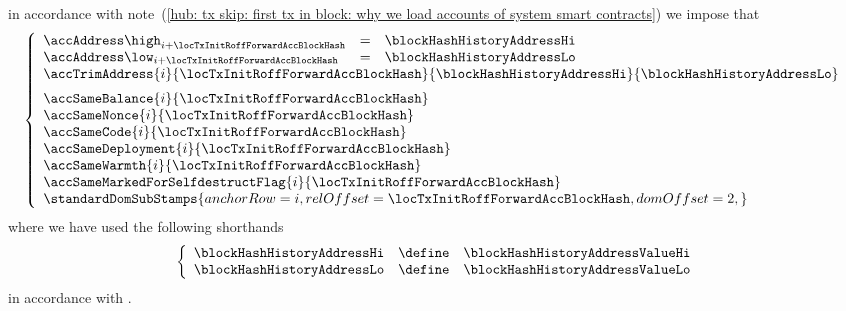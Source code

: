 \item[\underline{Loading the \inst{BLOCKHASH} system smart contract:}] 
	in accordance with
	note~(\ref{hub: tx skip: first tx in block: why we load accounts of system smart contracts})
	we impose that
	\[
		\left\{ \begin{array}{lclr}
			\accAddress  \high _{i + \locTxInitRoffForwardAccBlockHash} & = & \blockHashHistoryAddressHi \\
			\accAddress  \low  _{i + \locTxInitRoffForwardAccBlockHash} & = & \blockHashHistoryAddressLo \\
			\multicolumn{4}{l}{
				\accTrimAddress
				{i}{\locTxInitRoffForwardAccBlockHash}
				{\blockHashHistoryAddressHi}
				{\blockHashHistoryAddressLo}} \vspace{2mm} \\
			\multicolumn{3}{l}{\accSameBalance                       {i}{\locTxInitRoffForwardAccBlockHash}} \\
			\multicolumn{3}{l}{\accSameNonce                         {i}{\locTxInitRoffForwardAccBlockHash}} \\
			\multicolumn{3}{l}{\accSameCode                          {i}{\locTxInitRoffForwardAccBlockHash}} \\
			\multicolumn{3}{l}{\accSameDeployment                    {i}{\locTxInitRoffForwardAccBlockHash}} \\
			\multicolumn{3}{l}{\accSameWarmth                        {i}{\locTxInitRoffForwardAccBlockHash}} \\
			\multicolumn{3}{l}{\accSameMarkedForSelfdestructFlag     {i}{\locTxInitRoffForwardAccBlockHash}} \\
			\multicolumn{3}{l}{
				\standardDomSubStamps {
					anchorRow = i                                 ,
					relOffset = \locTxInitRoffForwardAccBlockHash ,
					domOffset = 2                                 ,
				}
			} \\
		\end{array} \right.
	\]
	where we have used the following shorthands
	\[
		\left\{ \begin{array}{lcl}
			\blockHashHistoryAddressHi & \define & \blockHashHistoryAddressValueHi \\
			\blockHashHistoryAddressLo & \define & \blockHashHistoryAddressValueLo \\
		\end{array} \right.
	\]
	in accordance with \cite{EIP-2935}.
